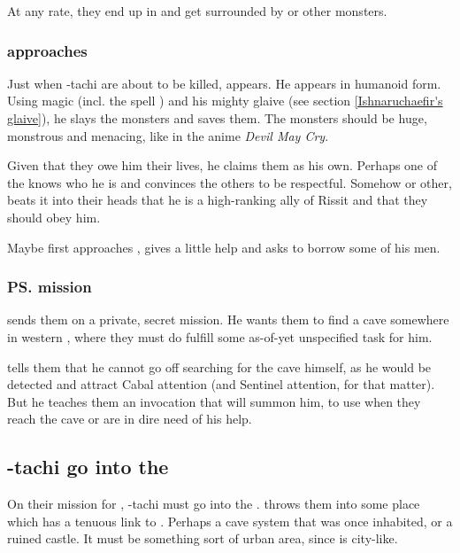 At any rate, they end up in \Nyx{} and get surrounded by \banes{} or other monsters. 






\subsubsection{\Ishnaruchaefir{} approaches}
Just when \Shilred-tachi are about to be killed, \Ishnaruchaefir{} appears. He appears in humanoid form. Using magic (incl. the spell ) and his mighty glaive (see section \ref{Ishnaruchaefir's glaive}), he slays the monsters and saves them. The monsters should be huge, monstrous and menacing, like in the anime \emph{Devil May Cry}. 

Given that they owe him their lives, he claims them as his own. Perhaps one of the \Gisshorns{} knows who he is and convinces the others to be respectful. Somehow or other, \Ishnaruchaefir{} beats it into their heads that he is a high-ranking ally of Rissit and that they should obey him. 

Maybe \Ishnaruchaefir{} first approaches \Narkiza{}, gives a little help and asks to borrow some of his men. 






\subsubsection{\ps{\Ishnaruchaefir} mission}
\Ishnaruchaefir{} sends them on a private, secret mission. He wants them to find a cave somewhere in western \Velcad{}, where they must do fulfill some as-of-yet unspecified task for him. 

\Ishnaruchaefir{} tells them that he cannot go off searching for the cave himself, as he would be detected and attract Cabal attention (and Sentinel attention, for that matter). But he teaches them an invocation that will summon him, to use when they reach the cave or are in dire need of his help. 








\subsection{\Shilred-tachi go into the \Wylde}
On their mission for \Ishnaruchaefir, \Shilred-tachi must go into the \Wylde{}. \Ishnaruchaefir{} throws them into some place which has a tenuous link to \Nyx. Perhaps a cave system that was once inhabited, or a ruined castle. It must be something sort of urban area, since \Nyx{} is city-like. 

